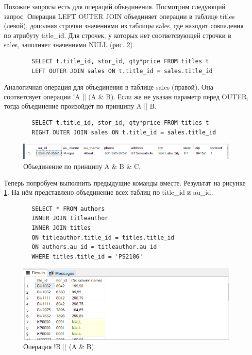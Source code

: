 Похожие запросы есть для операций объединения. Посмотрим следующий запрос. Операция LEFT OUTER JOIN объединяет операции в таблице titles (левой), дополняя строчки значениями из таблицы sales, где находит совпадения по атрибуту title\_id. Для строчек, у которых нет соответсвующей строчки в sales, заполняет значениями NULL (рис. \ref{fig:LEFT OUTER}).

\begin{verbatim}
        SELECT t.title_id, stor_id, qty*price FROM titles t
        LEFT OUTER JOIN sales ON t.title_id = sales.title_id
\end{verbatim}


Аналогичная операция для объединения в таблице sales (правой). Она соответсвует операции !A || (A \& B). Если же не указан параметр перед OUTER, тогда объединение произойдёт по принципу A || B. 
\begin{verbatim}
        SELECT t.title_id, stor_id, qty*price FROM titles t
        RIGHT OUTER JOIN sales ON t.title_id = sales.title_id
\end{verbatim}

\begin{figure}[h!]
    \centering
    \includegraphics[width=0.9\linewidth]{Pic/lab4/SQ12.PNG}
    \caption{Объединение по принципу A \& B \& C.}
    \label{fig:ABC}
\end{figure}

Теперь попробуем выполнить предыдущие команды вместе. Результат на рисунке \ref{fig:ABC}. На нём представлено объединение всех таблиц по title\_id и au\_id.
\begin{verbatim}
        SELECT * FROM authors 
        INNER JOIN titleauthor
        INNER JOIN titles
        ON titleauthor.title_id = titles.title_id
        ON authors.au_id = titleauthor.au_id
        WHERE titles.title_id = 'PS2106'
\end{verbatim}
\begin{figure}[h!]
    \centering
    \includegraphics[width=0.9\linewidth]{Pic/lab4/SQ11.PNG}
    \caption{Операция !B || (A \& B).}
    \label{fig:LEFT OUTER}
\end{figure}

